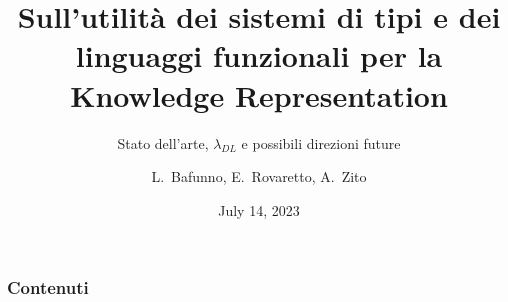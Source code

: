 \documentclass{beamer}
\title[Tipi e Ontologie]{Sull'utilità dei sistemi di tipi e dei linguaggi funzionali per la Knowledge Representation}
\subtitle{Stato dell'arte, $\lambda_{DL}$ e possibili direzioni future}
\author[Bafunno, Rovaretto, Zito]{L.~Bafunno, E.~Rovaretto, A.~Zito}
\institute[UniTo]{Dipartimento di Informatica\\
Università degli Studi di Torino}
\date{July 14, 2023}
\begin{document}
	\maketitle
	\begin{frame}
		\frametitle{Contenuti}
		\tableofcontents[hideallsubsections]
	\end{frame}
	
	
	
        
	
\end{document}
